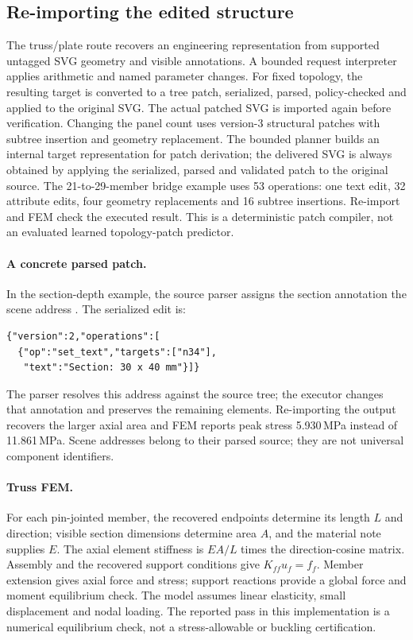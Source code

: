 \subsection{Re-importing the edited structure}
The truss/plate route recovers an engineering representation from supported untagged SVG geometry and
visible annotations. A bounded request interpreter applies arithmetic and named parameter changes.
For fixed topology, the resulting target is converted to a tree patch, serialized, parsed, policy-checked
and applied to the original SVG. The actual patched SVG is imported again before verification.
Changing the panel count uses version-3 structural patches with subtree insertion and geometry replacement.
The bounded planner builds an internal target representation for patch derivation; the delivered SVG is
always obtained by applying the serialized, parsed and validated patch to the original source. The
21-to-29-member bridge example uses 53 operations: one text edit, 32 attribute edits, four geometry
replacements and 16 subtree insertions. Re-import and FEM check the executed result. This is a
deterministic patch compiler, not an evaluated learned topology-patch predictor.

\paragraph{A concrete parsed patch.} In the section-depth example, the source parser assigns the
section annotation the scene address . The serialized edit is:
\begin{lstlisting}
{"version":2,"operations":[
  {"op":"set_text","targets":["n34"],
   "text":"Section: 30 x 40 mm"}]}
\end{lstlisting}
The parser resolves this address against the source tree; the executor changes that annotation and
preserves the remaining elements. Re-importing the output recovers the larger axial area and FEM
reports peak stress 5.930\,MPa instead of 11.861\,MPa. Scene addresses belong to their parsed source;
they are not universal component identifiers.

\paragraph{Truss FEM.} For each pin-jointed member, the recovered endpoints determine its length $L$
and direction; visible section dimensions determine area $A$, and the material note supplies $E$.
The axial element stiffness is $EA/L$ times the direction-cosine matrix. Assembly and the recovered
support conditions give $K_{ff}u_f=f_f$. Member extension gives axial force and stress; support
reactions provide a global force and moment equilibrium check. The model assumes linear elasticity,
small displacement and nodal loading. The reported pass in this implementation is a numerical
equilibrium check, not a stress-allowable or buckling certification.

